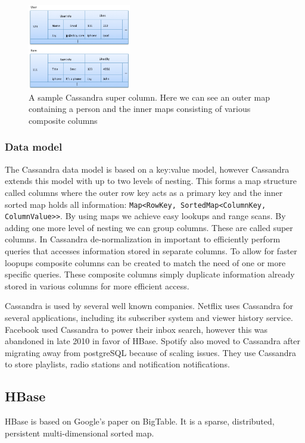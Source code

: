 \begin{figure}[h]
	\centering
	\includegraphics[width=0.4\textwidth]{background/figures/cas_super_col.png}
	\caption{A sample Cassandra super column. Here we can see an outer map containing a person and the inner maps consisting of various composite columns}
	\label{fig:sample_super_col}
\end{figure}

\subsubsection{Data model}
The Cassandra data model is based on a key:value model, however Cassandra extends this model with up to two levels of nesting. This forms a map structure called columns where the outer row key acts as a primary key and the inner sorted map holds all information: \texttt{Map<RowKey, SortedMap<ColumnKey, ColumnValue>>}. By using maps we achieve easy lookups and range scans. By adding one more level of nesting we can group columns. These are called super columns. 
In Cassandra de-normalization in important to efficiently perform queries that accesses information stored in separate columns. To allow for faster loopups composite columns can be created to match the need of one or more specific queries. These composite columns simply duplicate information already stored in various columns for more efficient access. 


Cassandra is used by several well known companies. Netflix uses Cassandra for several applications, including its subscriber system and viewer history service. Facebook used Cassandra to power their inbox search, however this was abandoned in late 2010 in favor of HBase. Spotify also moved to Cassandra after migrating away from postgreSQL because of scaling issues. They use Cassandra to store playlists, radio stations and notification notifications.

\subsection{HBase}
HBase is based on Google's paper on BigTable.
It is a sparse, distributed, persistent multi-dimensional sorted map.

